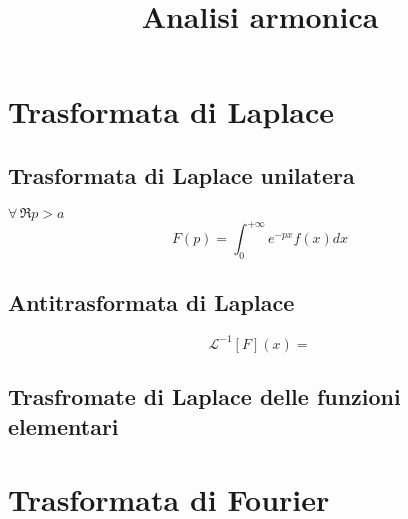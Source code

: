 \documentclass[a4paper,12pt]{article}
\begin{document}
\title{Analisi armonica}

\maketitle

\section{Trasformata di Laplace}

\subsection{Trasformata di Laplace unilatera}
\(\forall \, \Re p>a\)\\
\[
    F(p) = \int_{0}^{+\infty} e^{-px} f(x) dx
\] 

\subsection{Antitrasformata di Laplace}
\[
    \mathcal{L}^{-1} [F](x) = %
\]

\subsection{Trasfromate di Laplace delle funzioni elementari}




\section{Trasformata di Fourier}
\end{document}
